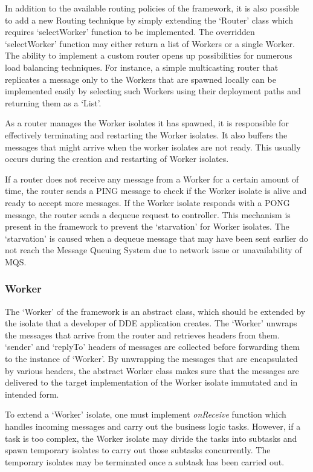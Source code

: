     In addition to the available routing policies of the framework, it is also possible to add a new Routing technique by simply extending the ‘Router’ class which requires ‘selectWorker’ function to be implemented. The overridden ‘selectWorker’ function may either return a list of Workers or a single Worker. The ability to implement a custom router opens up possibilities for numerous load balancing techniques. For instance, a simple multicasting router that replicates a message only to the Workers that are spawned locally can be implemented easily by selecting such Workers using their deployment paths and returning them as a ‘List’.

    As a router manages the Worker isolates it has spawned, it is responsible for effectively terminating and restarting the Worker isolates. It also buffers the messages that might arrive when the worker isolates are not ready. This usually occurs during the creation and restarting of Worker isolates.

    If a router does not receive any message from a Worker for a certain amount of time, the router sends a PING message to check if the Worker isolate is alive and ready to accept more messages. If the Worker isolate responds with a PONG message, the router sends a dequeue request to controller. This mechanism is present in the framework to prevent the ‘starvation’ for Worker isolates. The ‘starvation’ is caused when a dequeue message that may have been sent earlier do not reach the Message Queuing System due to network issue or unavailability of MQS.

  \subsubsection{Worker}
  \label{subsubsec:worker}
  The ‘Worker’ of the framework is an abstract class, which should be extended by the isolate that a developer of DDE application creates. The ‘Worker’ unwraps the messages that arrive from the router and retrieves headers from them. ‘sender’ and ‘replyTo’ headers of messages are collected before forwarding them to the instance of ‘Worker’. By unwrapping the messages that are encapsulated by various headers, the abstract Worker class makes sure that the messages are delivered to the target implementation of the Worker isolate immutated and in intended form.

  To extend a ‘Worker’ isolate, one must implement \emph{onReceive} function which handles incoming messages and carry out the business logic tasks. However, if a task is too complex, the Worker isolate may divide the tasks into subtasks and spawn temporary isolates to carry out those subtasks concurrently. The temporary isolates may be terminated once a subtask has been carried out.

